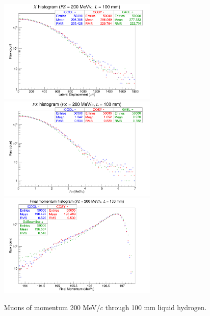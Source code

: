 \begin{figure}[H]
  \centering
    \includegraphics[width=0.7\textwidth]{Benchmarking/LH/X.200.100.png} 
    \includegraphics[width=0.7\textwidth]{Benchmarking/LH/PX.200.100.png} 
    \includegraphics[width=0.7\textwidth]{Benchmarking/LH/strag.200.100.png} 
  \caption{Muons of momentum 200 MeV/$c$ through 100 mm liquid hydrogen.}
  \label{fig:200.100}
\end{figure}

